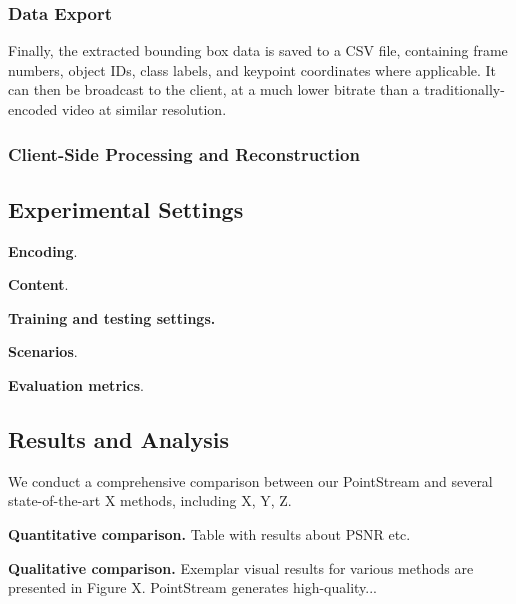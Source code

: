 \documentclass[sigconf, screen, review, anonymous]{acmart}
\begin{document}
\subsubsection{Data Export}
Finally, the extracted bounding box data is saved to a CSV file, containing frame numbers, object IDs, class labels, and keypoint coordinates where applicable. It can then be broadcast to the client, at a much lower bitrate than a traditionally-encoded video at similar resolution.

\subsubsection{Client-Side Processing and Reconstruction}


\subsection{Experimental Settings}
\textbf{Encoding}.

\textbf{Content}.

\textbf{Training and testing settings.}

\textbf{Scenarios}.

\textbf{Evaluation metrics}.
\subsection{Results and Analysis}
We conduct a comprehensive comparison between our PointStream and
several state-of-the-art X methods, including X, Y, Z.

\noindent

\textbf{Quantitative comparison.} Table with results about PSNR etc.

\noindent

\textbf{Qualitative comparison.} Exemplar visual results for various methods are presented in Figure X. PointStream generates high-quality...







\end{document}
